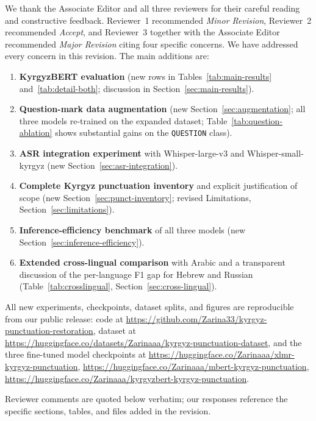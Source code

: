 \documentclass[manuscript, review]{acmart}
\begin{document}
We thank the Associate Editor and all three reviewers for their careful reading and constructive feedback. Reviewer~1 recommended \emph{Minor Revision}, Reviewer~2 recommended \emph{Accept}, and Reviewer~3 together with the Associate Editor recommended \emph{Major Revision} citing four specific concerns. We have addressed every concern in this revision. The main additions are:

\begin{enumerate}
\item \textbf{KyrgyzBERT evaluation} (new rows in Tables~\ref{tab:main-results} and~\ref{tab:detail-both}; discussion in Section~\ref{sec:main-results}).
\item \textbf{Question-mark data augmentation} (new Section~\ref{sec:augmentation}; all three models re-trained on the expanded dataset; Table~\ref{tab:question-ablation} shows substantial gains on the \texttt{QUESTION} class).
\item \textbf{ASR integration experiment} with Whisper-large-v3 and Whisper-small-kyrgyz (new Section~\ref{sec:asr-integration}).
\item \textbf{Complete Kyrgyz punctuation inventory} and explicit justification of scope (new Section~\ref{sec:punct-inventory}; revised Limitations, Section~\ref{sec:limitations}).
\item \textbf{Inference-efficiency benchmark} of all three models (new Section~\ref{sec:inference-efficiency}).
\item \textbf{Extended cross-lingual comparison} with Arabic and a transparent discussion of the per-language F1 gap for Hebrew and Russian (Table~\ref{tab:crosslingual}, Section~\ref{sec:cross-lingual}).
\end{enumerate}

\noindent All new experiments, checkpoints, dataset splits, and figures are reproducible from our public release: code at \url{https://github.com/Zarina33/kyrgyz-punctuation-restoration}, dataset at \url{https://huggingface.co/datasets/Zarinaaa/kyrgyz-punctuation-dataset}, and the three fine-tuned model checkpoints at \url{https://huggingface.co/Zarinaaa/xlmr-kyrgyz-punctuation}, \url{https://huggingface.co/Zarinaaa/mbert-kyrgyz-punctuation}, \url{https://huggingface.co/Zarinaaa/kyrgyzbert-kyrgyz-punctuation}.

Reviewer comments are quoted below verbatim; our responses reference the specific sections, tables, and files added in the revision.

\end{document}
